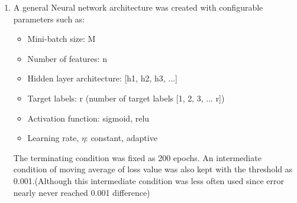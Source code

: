 \begin{enumerate}[label=(\alph*)]
    \item A general Neural network architecture was created with configurable parameters such as:
          \begin{itemize}
              \item Mini-batch size: M
              \item Number of features: n
              \item Hidden layer architecture: [h1, h2, h3, ...]
              \item Target labels: r (number of target labels [1, 2, 3, ... r])
              \item Activation function: sigmoid, relu
              \item Learning rate, $\eta$: constant, adaptive
          \end{itemize}
          The terminating condition was fixed as 200 epochs. An intermediate condition of moving average of loss value was also kept with the
          threshold as 0.001.(Although this intermediate condition was less often used since error nearly never reached 0.001 difference)


\end{enumerate}
